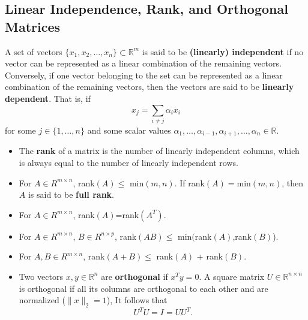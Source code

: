 \subsection{Linear Independence, Rank, and Orthogonal Matrices}
A set of vectors $\{x_{1},x_{2},\ldots,x_{n}\} \subset \mathbb{R}^{m}$ is said to be {\bf (linearly) independent} if no vector can be represented as a linear combination of the remaining vectors. Conversely, if one vector belonging to the set can be represented as a linear combination of the remaining vectors, then the vectors are said to be {\bf linearly dependent}. That is, if 
\begin{equation*}
x_{j}=\sum\limits_{i\neq j}\alpha_{i}x_{i}
\end{equation*}
for some $j \in \{1,\ldots,n\}$ and some scalar values $\alpha_{1}, \ldots, \alpha_{i-1}, \alpha_{i+1}, \ldots, \alpha_{n} \in \mathbb{R}$. 

\begin{itemize}
\item The {\bf rank} of a matrix is the number of linearly independent columns, which is always equal to the number of linearly independent rows.
\item For $A \in R^{m\times n}$, rank$(A) \leq$ min$(m,n)$. If rank$(A)=$min$(m,n)$, then $A$ is said
to be  {\bf full rank}.
\item For $A \in R^{m\times n}$, rank$(A)$=rank$(A^{T})$.
\item For $A \in R^{m\times n}$,  $B \in R^{n\times p}$, rank$(AB) \leq$ min$($rank$(A)$,rank$(B)$).
\item For $A,B \in R^{m\times n}$, rank$(A+B) \leq$ rank$(A)$ + rank$(B)$.
\item Two vectors $x,y \in \mathbb{R}^{n}$ are {\bf orthogonal} if $x^{T}y=0$. A square matrix $U \in \mathbb{R}^{n\times n}$ is orthogonal if all its columns are orthogonal to each other and are normalized ($\|x\|_{2} = 1$), It follows that
\begin{equation*}
U^{T}U=I=UU^{T}.
\end{equation*}
\end{itemize}



